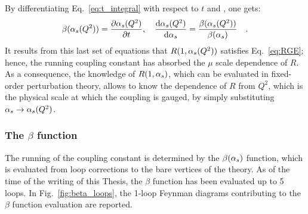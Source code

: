By differentiating Eq.~\ref{eq:t_integral} with respect to $t$ and \als, one gets:
\begin{equation}\label{eq:beta_def}
    \beta(\alpha_s(Q^2)) = \frac{\partial\alpha_s(Q^2)}{\partial t}, \quad \frac{\mathrm{d}\alpha_s(Q^2)}{\mathrm{d}\alpha_s} = \frac{\beta(\alpha_s (Q^2))}{\beta(\alpha_s)}\quad .
\end{equation}
It results from this last set of equations that $R(1,\alpha_s(Q^2))$ satisfies Eq.~\ref{eq:RGE}; hence, the running coupling constant has absorbed the $\mu$ scale dependence of $R$. As a consequence, the knowledge of $R(1,\alpha_s)$, which can be evaluated in fixed-order perturbation theory, allows to know the dependence of $R$ from $Q^2$, which is the physical scale at which the coupling is gauged, by simply substituting $\alpha_s \rightarrow \alpha_s(Q^2)$. 

\subsubsection{The \ensuremath{\beta} function}
The running of the coupling constant is determined by the $\beta(\alpha_s)$ function, which is evaluated from loop corrections to the bare vertices of the theory. As of the time of the writing of this Thesis, the $\beta$ function has been evaluated up to 5 loops\cite{Herzog:2017ohr}. In Fig.~\ref{fig:beta_loops}, the 1-loop Feynman diagrams contributing to the $\beta$ function evaluation are reported.

